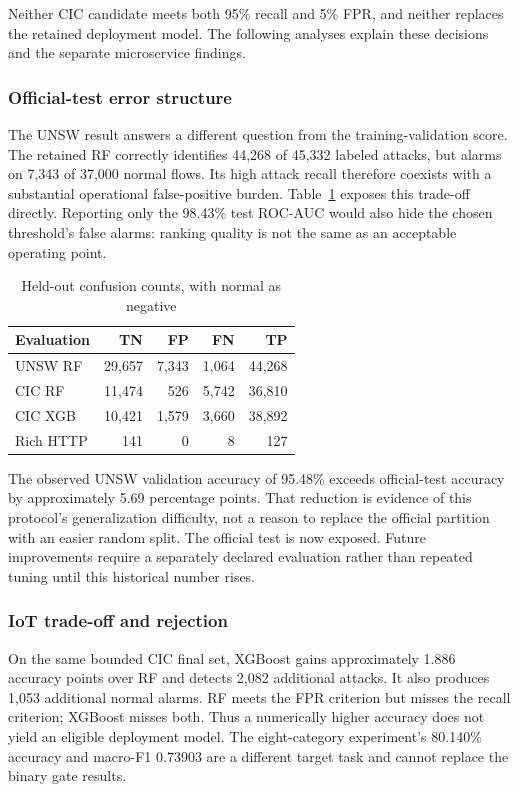 \documentclass[conference,a4paper]{IEEEtran}
\begin{document}
Neither CIC candidate meets both 95\% recall and 5\% FPR, and neither replaces the retained deployment model. The following analyses explain these decisions and the separate microservice findings.

\subsubsection{Official-test error structure}
The UNSW result answers a different question from the training-validation score. The retained RF correctly identifies 44,268 of 45,332 labeled attacks, but alarms on 7,343 of 37,000 normal flows. Its high attack recall therefore coexists with a substantial operational false-positive burden. Table~\ref{confusions} exposes this trade-off directly. Reporting only the 98.43\% test ROC-AUC would also hide the chosen threshold's false alarms: ranking quality is not the same as an acceptable operating point.

\begin{table}[t]
\caption{Held-out confusion counts, with normal as negative}
\label{confusions}\centering\footnotesize
\begin{tabular}{|l|r|r|r|r|}\hline
Evaluation & TN & FP & FN & TP\\\hline
UNSW RF &29,657&7,343&1,064&44,268\\\hline
CIC RF &11,474&526&5,742&36,810\\\hline
CIC XGB &10,421&1,579&3,660&38,892\\\hline
Rich HTTP &141&0&8&127\\\hline
\end{tabular}
\end{table}

The observed UNSW validation accuracy of 95.48\% exceeds official-test accuracy by approximately 5.69 percentage points. That reduction is evidence of this protocol's generalization difficulty, not a reason to replace the official partition with an easier random split. The official test is now exposed. Future improvements require a separately declared evaluation rather than repeated tuning until this historical number rises.

\subsubsection{IoT trade-off and rejection}
On the same bounded CIC final set, XGBoost gains approximately 1.886 accuracy points over RF and detects 2,082 additional attacks. It also produces 1,053 additional normal alarms. RF meets the FPR criterion but misses the recall criterion; XGBoost misses both. Thus a numerically higher accuracy does not yield an eligible deployment model. The eight-category experiment's 80.140\% accuracy and macro-F1 0.73903 are a different target task and cannot replace the binary gate results.
\end{document}
